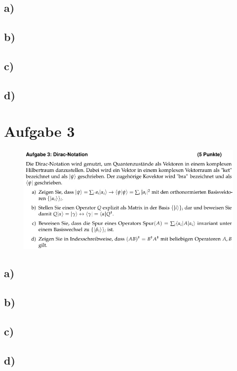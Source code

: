 \subsection{a)}

\subsection{b)}

\subsection{c)}

\subsection{d)}


\section{Aufgabe 3}

    \begin{figure}[H]
        \centering
        \includegraphics[width=\textwidth]{images/Aufgabe3.jpg}
        \label{fig:5}
    \end{figure}

\subsection{a)}

\subsection{b)}

\subsection{c)}

\subsection{d)}


